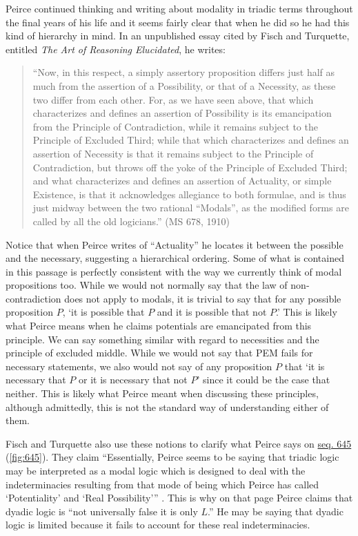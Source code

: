 Peirce continued thinking and writing about modality in triadic terms throughout the final years of his life and it seems fairly clear that when he did so he had this kind of hierarchy in mind. In an unpublished essay cited by Fisch and Turquette, entitled \textit{The Art of Reasoning Elucidated}, he writes:\begin{quotation} \noindent``Now, in this respect, a simply assertory proposition differs just half as much from the assertion of a Possibility, or that of a Necessity, as these two differ from each other. For, as we have seen above, that which characterizes and defines an assertion of Possibility is its emancipation from the Principle of Contradiction, while it remains subject to the Principle of Excluded Third; while that which characterizes and defines an assertion of Necessity is that it remains subject to the Principle of Contradiction, but throws off the yoke of the Principle of Excluded Third; and what characterizes and defines an assertion of Actuality, or simple Existence, is that it acknowledges allegiance to both formulae, and is thus just midway between the two rational ``Modals'', as the modified forms are called by all the old logicians.'' (MS 678, 1910)\end{quotation}
\noindent Notice that when Peirce writes of ``Actuality'' he locates it between the possible and the necessary, suggesting a hierarchical ordering. Some of what is contained in this passage is perfectly consistent with the way we currently think of modal propositions too. While we would not normally say that the law of non-contradiction does not apply to modals, it is trivial to say that for any possible proposition $P$, `it is possible that $P$ and it is possible that not $P$.' This is likely what Peirce means when he claims potentials are emancipated from this principle. We can say something similar with regard to necessities and the principle of excluded middle. While we would not say that PEM fails for necessary statements, we also would not say of any proposition $P$ that `it is necessary that $P$ or it is necessary that not $P$' since it could be the case that neither. This is likely what Peirce meant when discussing these principles, although admittedly, this is not the standard way of understanding either of them.

Fisch and Turquette also use these notions to clarify what Peirce says on \href{https://iiif.lib.harvard.edu/manifests/view/drs:15255301$645i}{seq. 645} (\ref{fig:645}). They claim ``Essentially, Peirce seems to be saying that triadic logic may be interpreted as a modal logic which is designed to deal with the indeterminacies resulting from that mode of being which Peirce has called `Potentiality' and `Real Possibility''' \citep{fisch_peirces_1966}. This is why on that page Peirce claims that dyadic logic is ``not universally false it is only $L$.'' He may be saying that dyadic logic is limited because it fails to account for these real indeterminacies.

